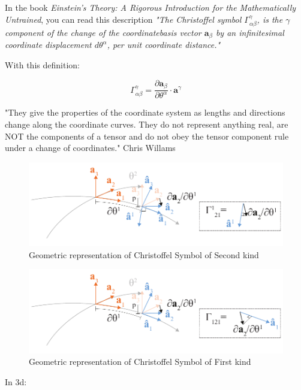 In the book  \textit{Einstein's Theory: A Rigorous Introduction for the Mathematically Untrained}, you can read this description \textit{ "The Christoffel symbol $\Gamma^\gamma_{\alpha \beta}$, is the $\gamma$ component of the change of the coordinatebasis vector $ \textbf{a}_\beta $ by an infinitesimal coordinate displacement $ d\theta^\alpha $, per unit coordinate
distance."} 

With this definition:

\begin{equation}
\Gamma^\gamma_{\alpha \beta} = \frac{\partial\textbf{a}_\beta}{\partial\theta^\alpha}\cdot \textbf{a}^\gamma
\end{equation}



"They give the properties of the coordinate system as lengths and directions change along the coordinate curves. They do not represent anything real, are NOT the components of a tensor and do not obey the tensor component rule under a change of coordinates." Chris Willams

\begin{figure}[H]
\centering
\includegraphics[width=0.9\linewidth ]{figure/Theory/christoffelSecondKind.pdf}
\caption{ Geometric representation of Christoffel Symbol of Second kind }
\end{figure}

\begin{figure}[H]
\centering
\includegraphics[width=0.9\linewidth ]{figure/Theory/christoffelFirstKind.pdf}
\caption{Geometric representation of Christoffel Symbol of First kind }
\end{figure}

In 3d:

